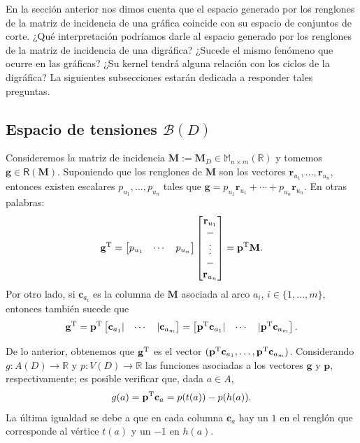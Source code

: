 En la sección anterior nos dimos cuenta que el espacio generado por los renglones de la matriz de incidencia de una gráfica coincide con su espacio de conjuntos de corte. ¿Qué interpretación podríamos darle al espacio generado por los renglones de la matriz de incidencia de una digráfica? ¿Sucede el mismo fenómeno que ocurre en las gráficas? ¿Su kernel tendrá alguna relación con los ciclos de la digráfica? La siguientes subsecciones estarán dedicada a responder tales preguntas. 

\subsection{Espacio de tensiones $\mathcal{B}(D)$}

 Consideremos la matriz de incidencia $\mathbf{M}:=\mathbf{M}_{D} \in \mathbb{M}_{n \times m}(\mathbb{R})$ y tomemos $\mathbf{g}\in \mathsf{R}(\mathbf{M})$. Suponiendo que los renglones de $\mathbf{M}$ son los vectores $\mathbf{r}_{u_1}, \ldots, \mathbf{r}_{u_n}$, entonces existen escalares $p_{u_{1}}, \ldots, p_{u_{n}}$ tales que $\mathbf{g} = p_{u_{1}}\mathbf{r}_{u_{1}} + \cdots + p_{u_{n}}\mathbf{r}_{u_{n}}$. En otras palabras:
$$
\mathbf{g}^{\textnormal{T}} = \begin{bmatrix}
p_{u_{1}} & \cdots & p_{u_{n}} 
\end{bmatrix}
\begin{bmatrix}
\mathbf{r}_{u_{1}}\\ 
\-- \\
\vdots\\
\--\\
\mathbf{r}_{u_{n}}
\end{bmatrix} = \mathbf{p}^{\textnormal{T}}\mathbf{M}.
$$
Por otro lado, si $\mathbf{c}_{a_{i}}$ es la columna de $\mathbf{M}$ asociada al arco $a_{i}$, $i \in \{1, \ldots, m\}$, entonces también sucede que $$\mathbf{g}^{{\textnormal{T}}}=\mathbf{p}^{\textnormal{T}}\begin{bmatrix}
\mathbf{c}_{a_{1}} | & \cdots & |\mathbf{c}_{a_{m}} 
\end{bmatrix} = \begin{bmatrix}
\mathbf{p}^{\textnormal{T}}\mathbf{c}_{a_{1}} | & \cdots & |\mathbf{p}^{\textnormal{T}}\mathbf{c}_{a_{m}} 
\end{bmatrix}.
$$

De lo anterior, obtenemos que $\mathbf{g}^{\textnormal{T}}$ es el vector $(\mathbf{p}^{\textnormal{T}}\mathbf{c}_{a_{1}},  \ldots, \mathbf{p}^{\textnormal{T}}\mathbf{c}_{a_{m}})$. Considerando $g\colon A(D) \rightarrow \mathbb{R}$ y $p \colon V(D) \rightarrow \mathbb{R}$ las funciones asociadas a los vectores $\mathbf{g}$ y $\mathbf{p}$, respectivamente; es posible verificar que, dada $a \in A$, 
\begin{equation} \label{eq:tensiones}
    g(a) = \mathbf{p}^{\textnormal{T}}\mathbf{c}_{a} = p(t(a)) - p(h(a)).
\end{equation}
La última igualdad se debe a que en cada columna $\mathbf{c}_{a}$ hay un $1$ en el renglón que corresponde al vértice $t(a)$ y un $-1$ en $h(a)$.


